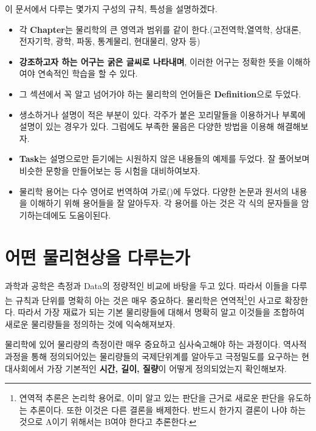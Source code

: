 \documentclass[article,chapter,openany,amsmath,gremph,lwarp]{oblivoir}
\begin{document}
\begin{flushleft}
이 문서에서 다루는 몇가지 구성의 규칙, 특성을 설명하겠다.
\begin{mdframed}\tightlists
\begin{itemize}[-]
 \item 각 \textbf{Chapter}는 물리학의 큰 영역과 범위를 같이 한다.(고전역학,열역학, 상대론, 전자기학, 광학, 파동, 통계물리, 현대물리, 양자 등)
 \item \textbf{강조하고자 하는 어구는 굵은 글씨로 나타내며}, 이러한 어구는 정확한 뜻을 이해하여야 연속적인 학습을 할 수 있다.
 \item 그 섹션에서 꼭 알고 넘어가야 하는 물리학의 언어들은 \textbf{Definition}으로 두었다. 
 \item 생소하거나 설명이 적은 부분이 있다. 각주가 붙은 꼬리말들을 이용하거나 부록에 설명이 있는 경우가 있다. 그럼에도 부족한 물음은 다양한 방법을 이용해 해결해보자. 
 \item \textbf{Task}는 설명으로만 듣기에는 시원하지 않은 내용들의 예제를 두었다. 잘 풀어보며 비슷한 문항을 만들어보는 등 시험을 대비하여보자.
 \item 물리학 용어는 다수 영어로 번역하여 가로()에 두었다. 다양한 논문과 원서의 내용을 이해하기 위해 용어들을 잘 알아두자. 각 용어를 아는 것은 각 식의 문자들을 
 암기하는데에도 도움이된다.  
\end{itemize}
\end{mdframed}



\section{어떤 물리현상을 다루는가}

과학과 공학은 측정과 Data의 정량적인 비교에 바탕을 두고 있다. 따라서 이들을 다루는 규칙과 단위를 명확히 아는 것은 매우 중요하다. 
물리학은 연역적\footnote{연역적 추론은 논리학 용어로, 이미 알고 있는 판단을 근거로 새로운 판단을 유도하는 추론이다. 또한 이것은 다른 결론을 배제한다. 반드시 
한가지 결론이 나야 하는 것으로 A이기 위해서는 B여야 한다고 추론한다.}인 사고로 확장한다. 따라서 가장 재료가 되는 기본 물리량들에 대해서 명확히 알고 이것들을 조합하여
새로운 물리량들을 정의하는 것에 익숙해져보자.

물리학에 있어 물리량의 측정이란 매우 중요하고 심사숙고해야 하는 과정이다. 
역사적 과정을 통해 정의되어있는 물리량들의 국제단위계를 알아두고 
극정밀도를 요구하는 현대사회에서 가장 기본적인 \textbf{시간, 길이, 질량}이 어떻게 정의되었는지 확인해보자. 


\end{flushleft}
\end{document}
